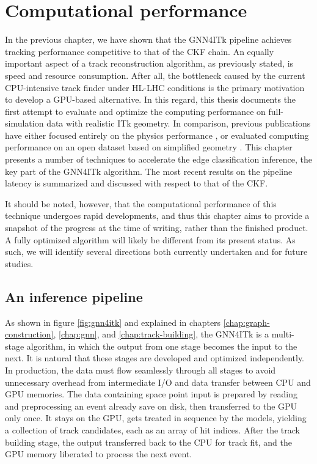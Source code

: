 \chapter{Computational performance}
\label{chap:computing-performace}

In the previous chapter, we have shown that the GNN4ITk pipeline achieves tracking performance competitive to that of the CKF chain. 
An equally important aspect of a track reconstruction algorithm, as previously stated, is speed and resource consumption.
After all, the bottleneck caused by the current CPU-intensive track finder under HL-LHC conditions is the primary motivation to develop a GPU-based alternative.
In this regard, this thesis documents the first attempt to evaluate and optimize the computing performance on full-simulation data with realistic ITk geometry. 
In comparison, previous publications have either focused entirely on the physics performance \cite{Burleson:2882507, ctd23-gnn4itk}, 
or evaluated computing performance on an open dataset based on simplified geometry \cite{exatrkx}. 
This chapter presents a number of techniques to accelerate the edge classification inference, the key part of the GNN4ITk algorithm. 
The most recent results on the pipeline latency is summarized and discussed with respect to that of the CKF. 

It should be noted, however, that the computational performance of this technique undergoes rapid developments, 
and thus this chapter aims to provide a snapshot of the progress at the time of writing, rather than the finished product.
A fully optimized algorithm will likely be different from its present status. 
As such, we will identify several directions both currently undertaken and for future studies.

\section{An inference pipeline}
As shown in figure \ref{fig:gnn4itk} and explained in chapters \ref{chap:graph-construction}, \ref{chap:gnn}, and \ref{chap:track-building}, the GNN4ITk is a multi-stage algorithm, in which the output from one stage becomes the input to the next.
It is natural that these stages are developed and optimized independently.
In production, the data must flow seamlessly through all stages to avoid unnecessary overhead from intermediate I/O and data transfer between CPU and GPU memories. 
The data containing space point input is prepared by reading and preprocessing an event already save on disk, then transferred to the GPU only once. 
It stays on the GPU, gets treated in sequence by the models, yielding a collection of track candidates, each as an array of hit indices. 
After the track building stage, the output transferred back to the CPU for track fit, and the GPU memory liberated to process the next event. 

